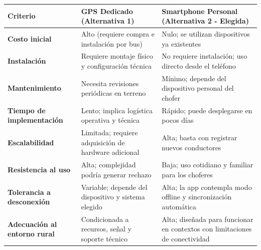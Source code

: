 \documentclass[12pt]{article}
\begin{document}
\begin{table}[!h]
        \begin{tabular}{|p{5cm}|p{5.5cm}|p{5.5cm}|}
            \hline
            \rowcolor[HTML]{D9D9D9}
            \textbf{Criterio} & \textbf{GPS Dedicado (Alternativa 1)} & \textbf{Smartphone Personal (Alternativa 2 - Elegida)} \\ \hline

            \textbf{Costo inicial} & Alto (requiere compra e instalación por bus) & Nulo; se utilizan dispositivos ya existentes \\ \hline
            \textbf{Instalación} & Requiere montaje físico y configuración técnica & No requiere instalación; uso directo desde el teléfono \\ \hline
            \textbf{Mantenimiento} & Necesita revisiones periódicas en terreno & Mínimo; depende del dispositivo personal del chofer \\ \hline
            \textbf{Tiempo de implementación} & Lento; implica logística operativa y técnica & Rápido; puede desplegarse en pocos días \\ \hline
            \textbf{Escalabilidad} & Limitada; requiere adquisición de hardware adicional & Alta; basta con registrar nuevos conductores \\ \hline
            \textbf{Resistencia al uso} & Alta; complejidad podría generar rechazo & Baja; uso cotidiano y familiar para los choferes \\ \hline
            \textbf{Tolerancia a desconexión} & Variable; depende del dispositivo y sistema elegido & Alta; la app contempla modo offline y sincronización automática \\ \hline
            \textbf{Adecuación al entorno rural} & Condicionada a recursos, señal y soporte técnico & Alta; diseñada para funcionar en contextos con limitaciones de conectividad \\ \hline

        \end{tabular}
\end{table}
\newpage
\end{document}
